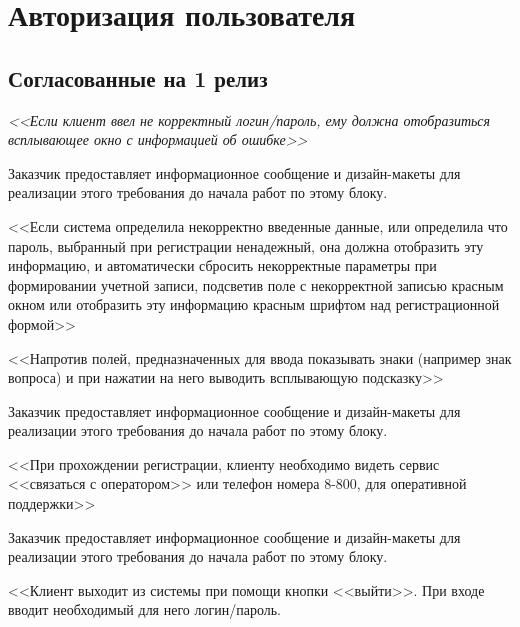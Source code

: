 \section{Авторизация пользователя}
\subsection{Согласованные на 1 релиз}
{
\textit{<<Если клиент ввел не корректный логин/пароль, ему должна отобразиться всплывающее окно с информацией об ошибке>>}

Заказчик предоставляет информационное сообщение и дизайн-макеты для реализации этого требования до начала работ по этому блоку. 
}
{
<<Если система определила некорректно введенные данные, или определила что пароль, выбранный при регистрации ненадежный, она должна отобразить эту информацию, и автоматически сбросить некорректные параметры при формировании учетной записи, подсветив поле с некорректной записью красным окном или отобразить эту информацию красным шрифтом над регистрационной формой>> 
}
{
<<Напротив полей, предназначенных для ввода показывать знаки (например знак вопроса) и при нажатии на него выводить всплывающую подсказку>>

Заказчик предоставляет информационное сообщение и дизайн-макеты для реализации этого требования до начала работ по этому блоку. 
}
{
<<При прохождении регистрации, клиенту необходимо видеть сервис <<связаться с оператором>> или телефон номера 8-800, для оперативной поддержки>>

Заказчик предоставляет информационное сообщение и дизайн-макеты для реализации этого требования до начала работ по этому блоку. 
}
{
<<Клиент выходит из системы при помощи кнопки <<выйти>>. При входе вводит необходимый для него логин/пароль.  
}





























